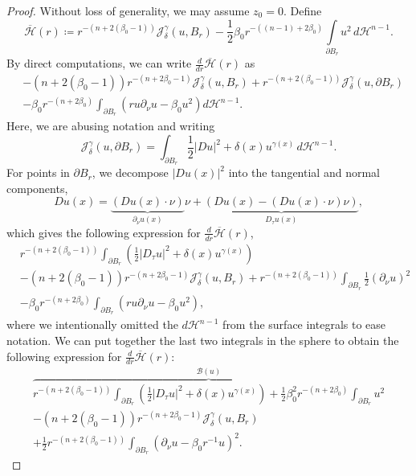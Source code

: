 \documentclass[reqno,11pt]{amsart}
\newcommand{\1}{\mathds{1}}
\numberwithin{equation}{section}
\begin{document}
\begin{proof}
Without loss of generality, we may assume $z_0 = 0$. Define
$$
  \overline{\mathcal{H}}(r) \coloneqq   r^{-(n + 2(\beta_0-1))}\mathcal{J}_\delta^\gamma(u,B_r) - \frac{1}{2}\beta_0 r^{-((n-1) + 2\beta_0)}\int\limits_{\partial B_r}u^2\, d\mathcal{H}^{n-1}.
$$
By direct computations, we can write $\frac{d}{dr}\overline{\mathcal{H}}(r)$ as
\begin{eqnarray*}
	  &   -(n + 2(\beta_0-1))r^{-(n + 2\beta_0-1)}\mathcal{J}_\delta^\gamma(u,B_r) + r^{-(n + 2(\beta_0-1))}\mathcal{J}_\delta^\gamma(u,\partial B_r)\\
	 & \displaystyle - \beta_0r^{-(n+2\beta_0)}\int_{\partial B_r}(ru\partial_\nu u - \beta_0 u^2)d\mathcal{H}^{n-1}.
\end{eqnarray*}
Here, we are abusing notation and writing
$$
  \mathcal{J}_\delta^\gamma(u,\partial B_r) = \int_{\partial B_r}\frac{1}{2}|Du|^2 + \delta(x)u^{\gamma(x)}\,d\mathcal{H}^{n-1}.  
$$
For points in $\partial B_r$, we decompose $|Du(x)|^2$ into the tangential and normal components, 
$$
	Du(x) = \underbrace{(Du(x) \cdot \nu)}_{\partial_\nu u(x)} \nu + \underbrace{(Du(x) - (Du(x) \cdot \nu) \nu)}_{D_\tau u(x)},
$$
which gives the following expression for $\frac{d}{dr}\overline{\mathcal{H}}(r)$,
\begin{align*}
	  &  r^{-(n + 2(\beta_0-1))}\int_{\partial B_r}\left(\frac{1}{2}|D_\tau u|^2 + \delta(x)u^{\gamma(x)}\right)\\
	  & -(n + 2(\beta_0-1))r^{-(n + 2\beta_0-1)}\mathcal{J}_\delta^\gamma(u,B_r) + r^{-(n + 2(\beta_0-1))}\int_{\partial B_r}\frac{1}{2}\left(\partial_\nu u\right)^2\\
	  & - \beta_0r^{-(n+2\beta_0)}\int_{\partial B_r}(ru\partial_\nu u - \beta_0 u^2),
\end{align*}
where we intentionally omitted the $d\mathcal{H}^{n-1}$ from the surface integrals to ease notation. We can put together the last two integrals in the sphere to obtain the following expression for $\frac{d}{dr}\overline{\mathcal{H}}(r)$:
\begin{eqnarray*}
	  \displaystyle  \overbrace{r^{-(n + 2(\beta_0-1))}\int_{\partial B_r}\left(\frac{1}{2}|D_\tau u|^2 + \delta(x)u^{\gamma(x)}\right) + \frac{1}{2}\beta_0^2r^{-(n+2\beta_0)}\int_{\partial B_r}u^2}^{\mathcal{B}(u)}\\
	  \displaystyle    -(n + 2(\beta_0-1))r^{-(n + 2\beta_0-1)}\mathcal{J}_\delta^\gamma(u,B_r)\\
	  \displaystyle + \frac{1}{2} r^{-(n+2(\beta_0-1))}\int_{\partial B_r}(\partial_\nu u - \beta_0r^{-1} u)^2.

\end{eqnarray*}
\end{proof}
\end{document}
